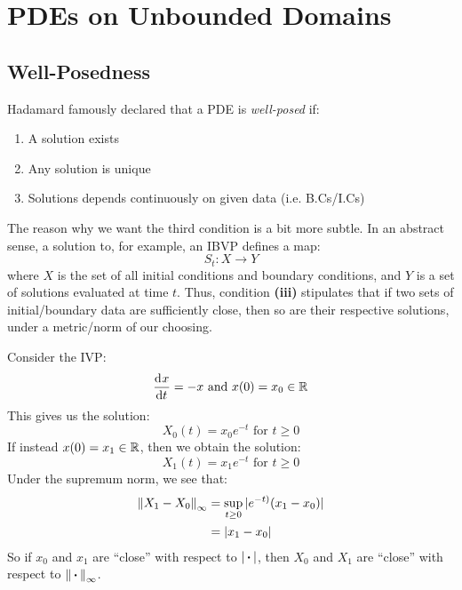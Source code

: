 \documentclass[../main.tex]{subfiles}
\begin{document}
\chapter{PDEs on Unbounded Domains}
\section{Well-Posedness}
Hadamard famously declared that a PDE is \textit{well-posed} if:
\begin{enumerate}
  \item A solution exists
  \item Any solution is unique
  \item Solutions depends continuously on given data (i.e. B.Cs/I.Cs)
\end{enumerate}
The reason why we want the third condition is a bit more subtle.
In an abstract sense, a solution to, for example, an IBVP defines a map:
\[
  S_t: X \to Y
\]
where $X$ is the set of all initial conditions and boundary conditions, and $Y$ is a set of solutions evaluated at time $t$.
Thus, condition \textbf{(iii)} stipulates that if two sets of initial/boundary data are sufficiently close, then so are their respective solutions, under a metric/norm of our choosing.
\begin{example}[IVP]
  Consider the IVP:
  \[
    \deriv{x}{t} = -x \text{ and } x(0) = x_0 \in \R
  \]
  This gives us the solution:
  \[
    X_0(t) = x_0 e^{-t} \text{ for } t \geq 0
  \]
  If instead $x(0) = x_1 \in \mathbb{R}$, then we obtain the solution:
  \[
    X_1(t) = x_1 e^{-t} \text{ for } t \geq 0
  \]
  Under the supremum norm, we see that:
  \begin{align*}
    \left\lVert X_1 - X_0 \right\rVert_{\infty} &= \sup_{t \geq 0} |e^{-t)}(x_1 - x_0)| \\
                              &= |x_1 - x_0|
  \end{align*}
  So if $x_0$ and $x_1$ are ``close'' with respect to $|{\hspace{0.18em}\boldsymbol{\cdot}\hspace{0.18em}}|$, then $X_0$ and $X_1$ are ``close'' with respect to $\left\lVert {\hspace{0.18em}\boldsymbol{\cdot}\hspace{0.18em}} \right\rVert_{\infty}$.
\end{example}
\end{document}
